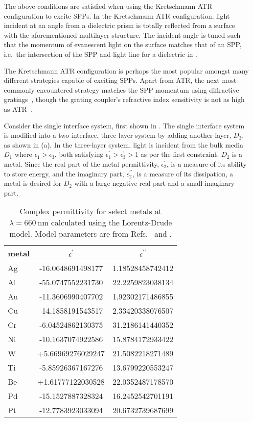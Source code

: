 The above conditions are satisfied when using the Kretschmann ATR
configuration to excite SPPs.  In the Kretschmann ATR configuration, light
incident at an angle from a dielectric prism is totally reflected from a
surface with the aforementioned multilayer structure.  The incident angle
is tuned such that the momentum of evanescent light on the surface matches
that of an SPP, i.e.\ the intersection of the SPP and light line
for a dielectric in .  

The Kretschmann ATR configuration is perhaps the most popular amongst many
different strategies capable of exciting SPPs.  Apart from ATR, the next
most commonly encountered strategy matches the SPP momentum using
diffractive gratings~\cite{homola1999surface}, though the grating coupler's
refractive index sensitivity is not as high as
ATR~\cite{homola1999senscomparison}.

Consider the single interface system, first shown in
.  The single interface system is modified
into a two interface, three-layer system by adding another layer, $D_3$, as
shown in (a).  In the three-layer system,
light is incident from the bulk media $D_1$ where $\epsilon_1>\epsilon_3$,
both satisfying $\epsilon^\prime_1>\epsilon^\prime_3>1$ as per the first
constraint.  $D_2$ is a metal.  Since the real part of the metal
permittivity, $\epsilon_2^\prime$, is a measure of its ability to store
energy, and the imaginary part, $\epsilon_2^{\prime\prime}$, is a measure of
its dissipation, a metal is desired for $D_2$ with a large negative real
part and a small imaginary part.
\begin{table}[ht]
\centering
{}
\begin{tabular}{lSS}
\toprule
metal & {$\epsilon^\prime$} & {$\epsilon^{\prime\prime}$} \\
\midrule
Ag & -16.0648691498177 & 1.18528458742412\\
Al & -55.0747552231730 & 22.2259823038134\\
Au & -11.3606990407702 & 1.92302171486855\\
Cu & -14.1858191543517 & 2.33420338076507\\
Cr & -6.04524862130375 & 31.2186141440352\\
Ni & -10.1637074922586 & 15.8784172933422\\
W  & +5.66969276029247 & 21.5082218271489\\
Ti & -5.85926367167276 & 13.6799220553247\\
Be & +1.61777122030528 & 22.0352487178570\\
Pd & -15.1527887328324 & 16.2452542701191\\
Pt & -12.7783923033094 & 20.6732739687699\\
\bottomrule
\end{tabular}
\caption{Complex permittivity for select metals at
$\lambda=\SI{660}{\nano\meter}$ calculated using the Lorentz-Drude
model.  Model parameters are from Refs.~\cite{ung2007interference} and
\cite{rakic1998optical}.}
\label{tbl:epsmetal600}
\end{table}

